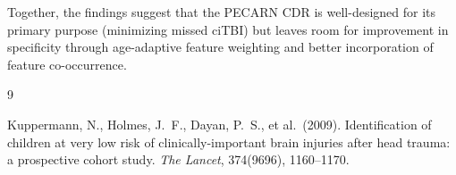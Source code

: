 \documentclass[10pt,letterpaper]{article}
\begin{document}
Together, the findings suggest that the PECARN CDR is well-designed for its primary purpose
(minimizing missed ciTBI) but leaves room for improvement in specificity through age-adaptive
feature weighting and better incorporation of feature co-occurrence.

\begin{thebibliography}{9}

Kuppermann, N., Holmes, J.~F., Dayan, P.~S., et al.\ (2009).
Identification of children at very low risk of clinically-important brain injuries after head
trauma: a prospective cohort study.
\textit{The Lancet}, 374(9696), 1160--1170.

\end{thebibliography}
\end{document}
